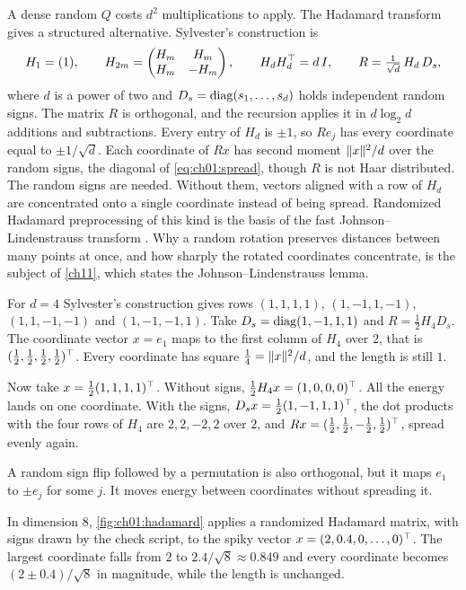 A dense random $Q$ costs $d^2$ multiplications to apply. The Hadamard transform
gives a structured alternative. Sylvester's construction is
\begin{equation}\label{eq:ch01:hadamard}
H_1=(1),\qquad H_{2m}=\begin{pmatrix}H_m&H_m\\H_m&-H_m\end{pmatrix},\qquad
H_dH_d^{\top}=d\,I,\qquad R=\tfrac{1}{\sqrt d}\,H_d\,D_s ,
\end{equation}
where $d$ is a power of two and $D_s=\operatorname{diag}(s_1,\dots,s_d)$ holds independent
random signs. The matrix $R$ is orthogonal, and the recursion applies it in
$d\log_2d$ additions and subtractions. Every entry of $H_d$ is $\pm1$, so
$R e_j$ has every coordinate equal to $\pm1/\sqrt d$. Each coordinate of $Rx$
has second moment $\lVert x\rVert^2/d$ over the random signs, the diagonal of
\cref{eq:ch01:spread}, though $R$ is not Haar distributed. The random signs
are needed. Without them, vectors aligned with a row of $H_d$ are concentrated
onto a single coordinate instead of being spread. Randomized Hadamard
preprocessing of this kind is the basis of the fast Johnson--Lindenstrauss
transform \cite{ailonchazelle2009}. Why a random rotation preserves distances
between many points at once, and how sharply the rotated coordinates
concentrate, is the subject of \cref{ch11}, which states the
Johnson--Lindenstrauss lemma.

\begin{example}\label{ex:ch01:hadamard}
For $d=4$ Sylvester's construction gives rows $(1,1,1,1)$, $(1,-1,1,-1)$,
$(1,1,-1,-1)$ and $(1,-1,-1,1)$. Take $D_s=\operatorname{diag}(1,-1,1,1)$ and
$R=\tfrac12H_4D_s$. The coordinate vector $x=e_1$ maps to the first column of
$H_4$ over $2$, that is $(\tfrac12,\tfrac12,\tfrac12,\tfrac12)^{\top}$. Every
coordinate has square $\tfrac14=\lVert x\rVert^2/d$, and the length is still $1$.

Now take $x=\tfrac12(1,1,1,1)^{\top}$. Without signs, $\tfrac12H_4x=(1,0,0,0)^{\top}$. All
the energy lands on one coordinate. With the signs, $D_sx=\tfrac12(1,-1,1,1)^{\top}$,
the dot products with the four rows of $H_4$ are $2,2,-2,2$ over $2$, and
$Rx=(\tfrac12,\tfrac12,-\tfrac12,\tfrac12)^{\top}$, spread evenly again.

A random sign flip followed by a permutation is also orthogonal, but it maps
$e_1$ to $\pm e_j$ for some $j$. It moves energy between coordinates without
spreading it.

In dimension $8$, \cref{fig:ch01:hadamard} applies a randomized Hadamard
matrix, with signs drawn by the check script, to the spiky vector
$x=(2,0.4,0,\dots,0)^{\top}$. The largest coordinate falls from $2$ to
$2.4/\sqrt8\approx0.849$ and every coordinate becomes $(2\pm0.4)/\sqrt8$ in
magnitude, while the length is unchanged.
\end{example}

